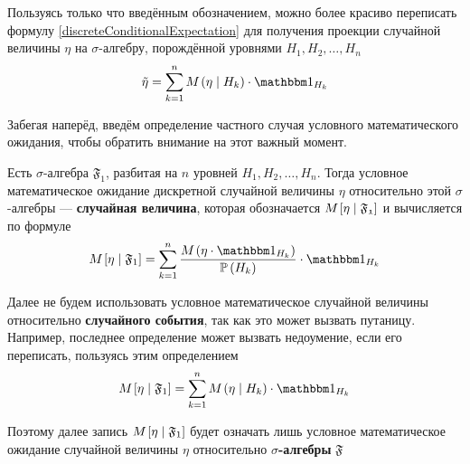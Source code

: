 Пользуясь только что введённым обозначением,
можно более красиво переписать формулу \eqref{discreteConditionalExpectation}
для получения проекции случайной величины $\eta$ на $\sigma$-алгебру,
порождённой уровнями $H_1, H_2, \dots, H_n$ 
$$\tilde{\eta}
    = \sum_{k=1}^n \mean{\left( \eta \mid H_k \right)} \cdot \indicatorof{H_k}$$

Забегая наперёд,
введём определение частного случая условного математического ожидания,
чтобы обратить внимание на этот важный момент.

\begin{definition}
    Есть $\sigma$-алгебра $\mathfrak{F}_1$,
    разбитая на $n$ уровней $H_1, H_2, \dots, H_n$.
    Тогда условное математическое ожидание дискретной случайной величины
    $\eta$ относительно этой $\sigma$-алгебры --- \textbf{случайная величина},
    которая обозначается $M_{} \left[ \eta \mid \mathfrak{F_1} \right]$
    и вычисляется по формуле
    $$\mean{\left[ \eta \mid \mathfrak{F}_1 \right]}
        = \sum_{k=1}^n
            \frac{\mean{\left( \eta \cdot \indicatorof{H_k} \right)}}
                {\probability{H_k}}
            \cdot \indicatorof{H_k}$$
\end{definition}

\begin{remark}
    Далее не будем использовать условное математическое случайной величины
    относительно \textbf{случайного события},
    так как это может вызвать путаницу.
    Например, последнее определение может вызвать недоумение,
    если его переписать, пользуясь этим определением
    $$\mean{\left[ \eta \mid \mathfrak{F}_1 \right]}
        = \sum_{k=1}^n \mean{\left( \eta \mid H_k \right)}
            \cdot \indicatorof{H_k}$$

    Поэтому далее запись $M_{} \left[ \eta \mid \mathfrak{F}_1 \right]$
    будет означать лишь условное математическое ожидание
    случайной величины $\eta$
    относительно \textbf{$\sigma$-алгебры} $\mathfrak{F}$
\end{remark}
